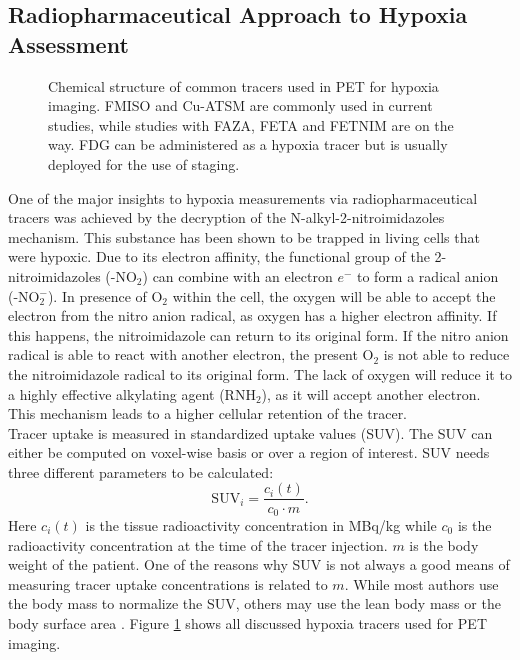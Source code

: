 \subsection{Radiopharmaceutical Approach to Hypoxia Assessment}\label{chap:tracers}
\begin{figure}[p]
\centering
{}
\hspace{0.3cm}
\hspace{0.3cm}
\hspace{0.3cm}
\hspace{0.3cm}
\caption{Chemical structure of common tracers used in PET for hypoxia imaging. FMISO and Cu-ATSM are commonly used in current studies, while studies with FAZA, FETA and FETNIM are on the way. FDG can be administered as a hypoxia tracer but is usually deployed for the use of staging.}
\label{fig:hypoxiatracer}
\end{figure}
One of the major insights to hypoxia measurements via radiopharmaceutical tracers was achieved by the decryption of the N-alkyl-2-nitroimidazoles mechanism. This substance has been shown to be trapped in living cells that were hypoxic. Due to its electron affinity, the functional group of the 2-nitroimidazoles (-NO$_2$) can combine with an electron $e^-$ to form a radical anion (-NO$_2^-$). In presence of O$_2$ within the cell, the oxygen will be able to accept the electron from the nitro anion radical, as oxygen has a higher electron affinity. If this happens, the nitroimidazole can return to its original form. If the nitro anion radical is able to react with another electron, the present O$_2$ is not able to reduce the nitroimidazole radical to its original form. The lack of oxygen will reduce it to a highly effective alkylating agent (RNH$_2$), as it will accept another electron. This mechanism leads to a higher cellular retention of the tracer.\\Tracer uptake is measured in standardized uptake values (SUV). The SUV can either be computed on voxel-wise basis or over a region of interest. SUV needs three different parameters to be calculated:
\begin{equation}
\mathrm{SUV}_i = \frac{c_i(t)}{c_0\cdot m}.
\end{equation}
Here $c_i(t)$ is the tissue radioactivity concentration in MBq/kg while $c_0$ is the radioactivity concentration at the time of the tracer injection. $m$ is the body weight of the patient. One of the reasons why SUV is not always a good means of measuring tracer uptake concentrations is related to $m$. While most authors use the body mass to normalize the SUV, others may use the lean body mass \cite{pmid8234714} or the body surface area \cite{pmid8271040}. Figure \ref{fig:hypoxiatracer} shows all discussed hypoxia tracers used for PET imaging.
